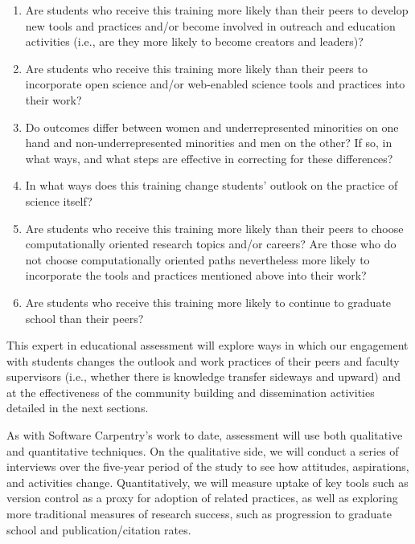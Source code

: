 \documentclass{proposalnsf}
\newlength{\up}
\begin{document}
\begin{enumerate}
\item
  Are students who receive this training more likely than their peers
  to develop new tools and practices and/or become involved in
  outreach and education activities (i.e., are they more likely to
  become creators and leaders)?

\item
  Are students who receive this training more likely than their peers
  to incorporate open science and/or web-enabled science tools and
  practices into their work?

\item
  Do outcomes differ between women and underrepresented minorities on
  one hand and non-underrepresented minorities and men on the other?
  If so, in what ways, and what steps are effective in correcting for
  these differences?

\item
  In what ways does this training change students' outlook on the
  practice of science itself?

\item
  Are students who receive this training more likely than their peers
  to choose computationally oriented research topics and/or careers?
  Are those who do not choose computationally oriented paths
  nevertheless more likely to incorporate the tools and practices
  mentioned above into their work?

\item
  Are students who receive this training more likely to continue to
  graduate school than their peers?

\end{enumerate}

This expert in educational assessment will explore ways in which our engagement with
students changes the outlook and work practices of their peers and
faculty supervisors (i.e., whether there is knowledge transfer
sideways and upward) and at the effectiveness of the community
building and dissemination activities detailed in the next sections. 

As with Software Carpentry's work to date,
assessment will use both qualitative and quantitative techniques.  On
the qualitative side, we will conduct a series of interviews over the
five-year period of the study to see how attitudes, aspirations, and
activities change. Quantitatively, we will measure uptake of key
tools such as version control as a proxy for adoption of related
practices, as well as exploring more traditional measures of research
success, such as progression to graduate school and
publication/citation rates. 
\end{document}
